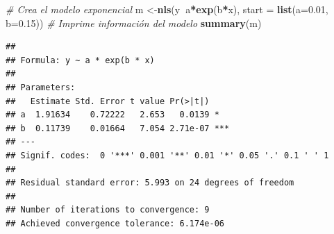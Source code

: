 \documentclass[]{article}
\newenvironment{Shaded}{\begin{snugshade}}{\end{snugshade}}
\newcommand{\CommentTok}[1]{\textcolor[rgb]{0.56,0.35,0.01}{\textit{#1}}}
\newcommand{\DataTypeTok}[1]{\textcolor[rgb]{0.13,0.29,0.53}{#1}}
\newcommand{\DecValTok}[1]{\textcolor[rgb]{0.00,0.00,0.81}{#1}}
\newcommand{\FloatTok}[1]{\textcolor[rgb]{0.00,0.00,0.81}{#1}}
\newcommand{\KeywordTok}[1]{\textcolor[rgb]{0.13,0.29,0.53}{\textbf{#1}}}
\newcommand{\NormalTok}[1]{#1}
\newcommand{\OperatorTok}[1]{\textcolor[rgb]{0.81,0.36,0.00}{\textbf{#1}}}
\newcommand{\StringTok}[1]{\textcolor[rgb]{0.31,0.60,0.02}{#1}}
\begin{document}
\begin{Shaded}
\end{Shaded}

\begin{Shaded}
\begin{Highlighting}[]
\CommentTok{# Crea el modelo exponencial}
\NormalTok{m <-}\KeywordTok{nls}\NormalTok{(y}\OperatorTok{~}\NormalTok{a}\OperatorTok{*}\KeywordTok{exp}\NormalTok{(b}\OperatorTok{*}\NormalTok{x), }\DataTypeTok{start =} \KeywordTok{list}\NormalTok{(}\DataTypeTok{a=}\FloatTok{0.01}\NormalTok{, }\DataTypeTok{b=}\FloatTok{0.15}\NormalTok{))}
\CommentTok{# Imprime información del modelo}
\KeywordTok{summary}\NormalTok{(m)}
\end{Highlighting}
\end{Shaded}

\begin{verbatim}
## 
## Formula: y ~ a * exp(b * x)
## 
## Parameters:
##   Estimate Std. Error t value Pr(>|t|)    
## a  1.91634    0.72222   2.653   0.0139 *  
## b  0.11739    0.01664   7.054 2.71e-07 ***
## ---
## Signif. codes:  0 '***' 0.001 '**' 0.01 '*' 0.05 '.' 0.1 ' ' 1
## 
## Residual standard error: 5.993 on 24 degrees of freedom
## 
## Number of iterations to convergence: 9 
## Achieved convergence tolerance: 6.174e-06
\end{verbatim}
\end{document}
